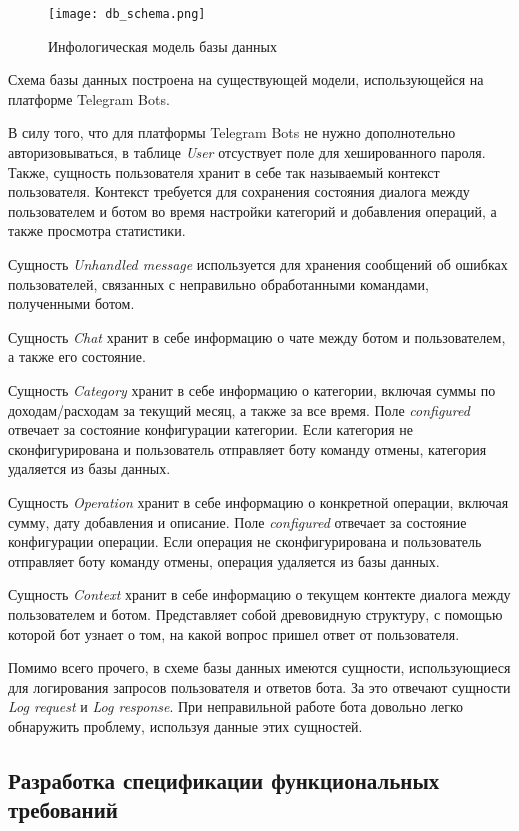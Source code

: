 \begin{sidewaysfigure}
\centering
	\texttt{[image: db\_schema.png]}
	\caption{Инфологическая модель базы данных}
	\label{fig:domain:model:db:model}
\end{sidewaysfigure}

Схема базы данных построена на существующей модели, использующейся на платформе Telegram Bots.

В силу того, что для платформы Telegram Bots не нужно дополнотельно авторизовываться, в таблице \emph{User} отсуствует поле для хешированного пароля. Также, сущность пользователя хранит в себе так называемый контекст пользователя. Контекст требуется для сохранения состояния диалога между пользователем и ботом во время настройки категорий и добавления операций, а также просмотра статистики. 

Сущность \emph{Unhandled message} используется для хранения сообщений об ошибках пользователей, связанных с неправильно обработанными командами, полученными ботом.

Сущность \emph{Chat} хранит в себе информацию о чате между ботом и пользователем, а также его состояние.

Сущность \emph{Category} хранит в себе информацию о категории, включая суммы по доходам/расходам за текущий месяц, а также за все время. Поле \emph{configured} отвечает за состояние конфигурации категории. Если категория не сконфигурирована и пользователь отправляет боту команду отмены, категория удаляется из базы данных.

Сущность \emph{Operation} хранит в себе информацию о конкретной операции, включая сумму, дату добавления и описание. Поле \emph{configured} отвечает за состояние конфигурации операции. Если операция не сконфигурирована и пользователь отправляет боту команду отмены, операция удаляется из базы данных.

Сущность \emph{Context} хранит в себе информацию о текущем контекте диалога между пользователем и ботом. Представляет собой древовидную структуру, с помощью которой бот узнает о том, на какой вопрос пришел ответ от пользователя.

Помимо всего прочего, в схеме базы данных имеются сущности, использующиеся для логирования запросов пользователя и ответов бота. За это отвечают сущности \emph{Log request} и \emph{Log response}. При неправильной работе бота довольно легко обнаружить проблему, используя данные этих сущностей.

\subsection{Разработка спецификации функциональных требований}
\label{sec:domain:specification}

